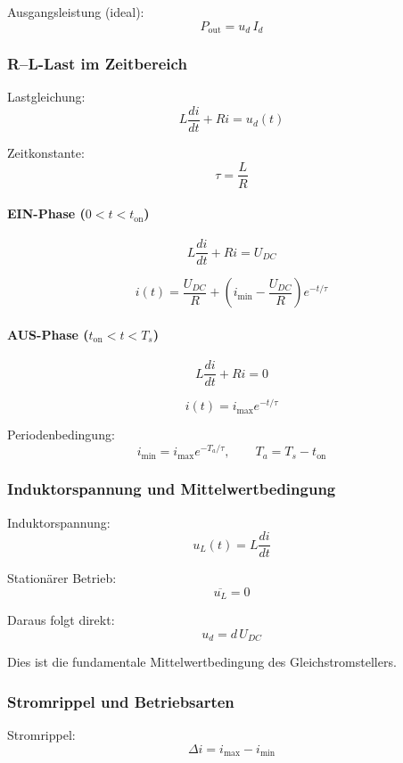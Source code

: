 Ausgangsleistung (ideal):
\[
\boxed{P_{\mathrm{out}}=u_d\,I_d}
\]

\subsubsection{R--L-Last im Zeitbereich}

Lastgleichung:
\[
L\frac{di}{dt}+Ri=u_d(t)
\]

Zeitkonstante:
\[
\boxed{\tau=\frac{L}{R}}
\]

\paragraph{EIN-Phase ($0<t<t_{\mathrm{on}}$)}

\[
L\frac{di}{dt}+Ri=U_{DC}
\]

\[
\boxed{
i(t)=\frac{U_{DC}}{R}
+\left(i_{\min}-\frac{U_{DC}}{R}\right)e^{-t/\tau}
}
\]

\paragraph{AUS-Phase ($t_{\mathrm{on}}<t<T_s$)}

\[
L\frac{di}{dt}+Ri=0
\]

\[
\boxed{
i(t)=i_{\max}e^{-t/\tau}
}
\]

Periodenbedingung:
\[
\boxed{i_{\min}=i_{\max}e^{-T_a/\tau}}, 
\qquad T_a=T_s-t_{\mathrm{on}}
\]

\subsubsection{Induktorspannung und Mittelwertbedingung}

Induktorspannung:
\[
u_L(t)=L\frac{di}{dt}
\]

Stationärer Betrieb:
\[
\boxed{\overline{u_L}=0}
\]

Daraus folgt direkt:
\[
\boxed{u_d=d\,U_{DC}}
\]

Dies ist die fundamentale Mittelwertbedingung des Gleichstromstellers.

\subsubsection{Stromrippel und Betriebsarten}

Stromrippel:
\[
\boxed{\Delta i=i_{\max}-i_{\min}}
\]


